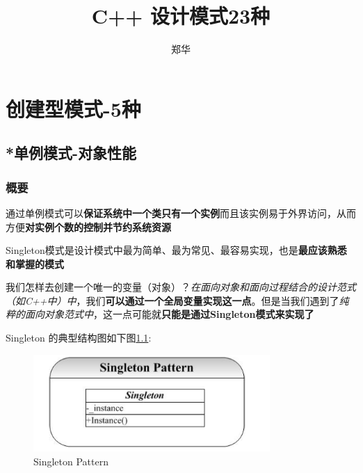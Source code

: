 \documentclass[UTF8,a4paper,12pt]{ctexbook}
\author{\kaishu 郑华}
\title{\textbf{C++ 设计模式23种}}
\begin{document}
	\maketitle
	\tableofcontents
	
\chapter{创建型模式-5种}
\section{*单例模式-对象性能}
	\subsection{概要}
		通过单例模式可以\textbf{保证系统中一个类只有一个实例}而且该实例易于外界访问，从而方便\textbf{对实例个数的控制并节约系统资源}
		
		Singleton模式是设计模式中最为简单、最为常见、最容易实现，也是\textbf{最应该熟悉和掌握的模式}
		
		我们怎样去创建一个唯一的变量（对象）？\textit{在面向对象和面向过程结合的设计范式（如C++中）中}，我们\textbf{可以通过一个全局变量实现这一点}。但是当我们遇到了\textit{纯粹的面向对象范式中}，这一点可能就\textbf{只能是通过Singleton模式来实现了}
		
		Singleton 的典型结构图如下图\ref{singleton}:
		\begin{figure}[h]
			\centering
			\includegraphics[width = 9cm]{Singleton.png}
			\caption{Singleton Pattern}
			\label{singleton}
		\end{figure}	
\end{document}
